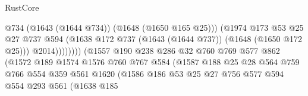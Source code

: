 \begin{lexlean}{RustCore}
\begin{coremodule}
                                                @734
                                                (@1643 (@1644 @734))
                                                (@1648 (@1650 @165 @25)))
                                              (@1974
                                                @173
                                                @53
                                                @25
                                                @27
                                                @737
                                                @594
                                                (@1638
                                                  @172
                                                  @737
                                                  (@1643 (@1644 @737))
                                                  (@1648 (@1650 @172 @25)))
                                                @2014))))))))
                                (@1557
                                  @190
                                  @238
                                  @286
                                  @32
                                  @760
                                  @769
                                  @577
                                  @862
                                  (@1572
                                    @189
                                    @1574
                                    @1576
                                    @760
                                    @767
                                    @584
                                    (@1587
                                      @188
                                      @25
                                      @28
                                      @564
                                      @759
                                      @766
                                      @554
                                      @359
                                      @561
                                      @1620
                                      (@1586
                                        @186
                                        @53
                                        @25
                                        @27
                                        @756
                                        @577
                                        @594
                                        @554
                                        @293
                                        @561
                                        (@1638
                                          @185

\end{coremodule}
\end{lexlean}
